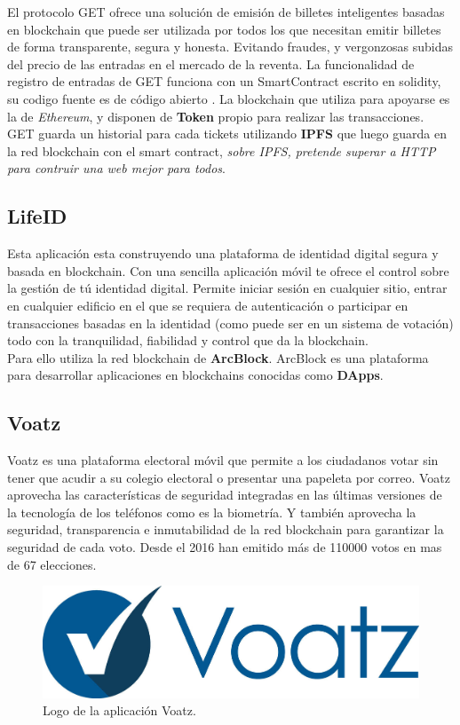 El protocolo GET ofrece una solución de emisión de billetes inteligentes basadas en blockchain que puede ser utilizada por todos los que necesitan emitir billetes de forma transparente, segura y honesta. Evitando fraudes, y vergonzosas subidas del precio de las entradas en el mercado de la reventa. La funcionalidad de registro de entradas de GET funciona con un SmartContract escrito en solidity, su codigo fuente es de código abierto \cite{srcGET}. La blockchain que utiliza para apoyarse es la de \emph{Ethereum}, y disponen de \textbf{Token} propio para realizar las transacciones\cite{tokGET}. GET guarda un historial para cada tickets utilizando \textbf{IPFS}\cite{IPFS} que luego guarda en la red blockchain con el smart contract, \emph{sobre IPFS, pretende superar a HTTP para contruir una web mejor para todos}.

\subsection{LifeID}

Esta aplicación esta construyendo una plataforma de identidad digital segura y basada en blockchain. Con una sencilla aplicación móvil te ofrece el control sobre la gestión de tú identidad digital. Permite iniciar sesión en cualquier sitio, entrar en cualquier edificio en el que se requiera de autenticación o participar en transacciones basadas en la identidad (como puede ser en un sistema de votación) todo con la tranquilidad, fiabilidad y control que da la blockchain. \\ 

Para ello utiliza la red blockchain de \textbf{ArcBlock}\cite{webArc,alianzaArc}. ArcBlock es una plataforma para desarrollar aplicaciones en blockchains conocidas como \textbf{DApps}\cite{dapps}. 

\clearpage
\subsection{Voatz}

Voatz es una plataforma electoral móvil que permite a los ciudadanos votar sin tener que acudir a su colegio electoral o presentar una papeleta por correo. Voatz aprovecha las características de seguridad integradas en las últimas versiones de la tecnología de los teléfonos como es la biometría. Y también aprovecha la seguridad, transparencia e inmutabilidad de la red blockchain para garantizar la seguridad de cada voto. Desde el 2016 han emitido más de 110000 votos en mas de 67 elecciones. 

\begin{figure}[h!]
  \centering
  \includegraphics[width=0.6\linewidth]{figs/EstadoArte/Apps/voatz}
  \caption[Nodos vista genérica]{Logo de la aplicación Voatz.}
  \label{fig:Voatz}
\end{figure}
